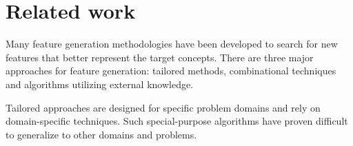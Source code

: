 \documentclass[letterpaper]{article} %
\theoremstyle{definition}
\begin{document}
		
		
		
		
		

\section{Related work}

Many feature generation methodologies have been developed to search for new features that better represent the target concepts. There are three major approaches for feature generation: tailored methods, combinational techniques and algorithms utilizing external knowledge.

Tailored approaches \cite{sutton1991learning,hirsh1994bootstrapping} are designed for specific problem domains and rely on domain-specific techniques. %
Such special-purpose algorithms %
have proven difficult to generalize to other domains and problems.
\end{document}

